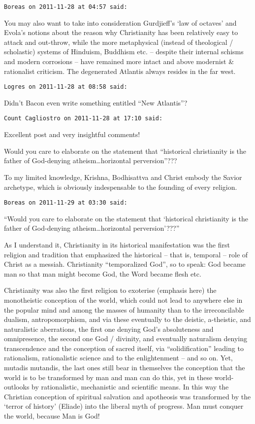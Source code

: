 \begin{footnotesize}
\begin{sffamily}
\hfill

\texttt{Boreas on 2011-11-28 at 04:57 said: }

You may also want to take into consideration Gurdjieff's `law of octaves' and Evola's notions about the reason why Christianity has been relatively easy to attack and out-throw, while the more metaphysical (instead of theological / scholastic) systems of Hinduism, Buddhism etc. – despite their internal schisms and modern corrosions – have remained more intact and above modernist \& rationalist criticism. The degenerated Atlantis always resides in the far west.


\hfill

\texttt{Logres on 2011-11-28 at 08:58 said: }

Didn't Bacon even write something entitled “New Atlantis”?


\hfill

\texttt{Count Cagliostro on 2011-11-28 at 17:10 said: }

Excellent post and very insightful comments!

Would you care to elaborate on the statement that “historical christianity is the father of God-denying atheism…horizontal perversion”???

To my limited knowledge, Krishna, Bodhisattva and Christ embody the Savior archetype, which is obviously indespensable to the founding of every religion.


\hfill

\texttt{Boreas on 2011-11-29 at 03:30 said: }

``Would you care to elaborate on the statement that `historical christianity is the father of God-denying atheism…horizontal perversion'???''

As I understand it, Christianity in its historical manifestation was the first religion and tradition that emphasized the historical – that is, temporal – role of Christ as a messiah. Christianity “temporalized God”, so to speak: God became man so that man might become God, the Word became flesh etc.

Christianity was also the first religion to exoterise (emphasis here) the monotheistic conception of the world, which could not lead to anywhere else in the popular mind and among the masses of humanity than to the irreconcilable dualism, antropomorphism, and via these eventually to the deistic, a-theistic, and naturalistic aberrations, the first one denying God's absoluteness and omnipresence, the second one God / divinity, and eventually naturalism denying transcendence and the conception of sacred itself, via “solidification” leading to rationalism, rationalistic science and to the enlightenment – and so on. Yet, mutadis mutandis, the last ones still bear in themselves the conception that the world is to be transformed by man and man can do this, yet in these world-outlooks by rationalistic, mechanistic and scientific means. In this way the Christian conception of spiritual salvation and apotheosis was transformed by the `terror of history' (Eliade) into the liberal myth of progress. Man must conquer the world, because Man is God!


\end{sffamily}
\end{footnotesize}
